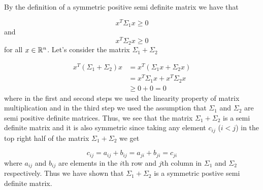 
By the definition of a symmetric positive semi definite matrix we have that 

\[
    x^{T} \Sigma_{1} x \geq 0
\] 
and 
\[
    x^{T}  \Sigma_{2} x \geq 0 
\] 
for all $ x \in \mathbb{R}^{n} $. Let's consider the matrix $ \Sigma_1 + \Sigma_2$

\begin{align*}
   x^{T} ( \Sigma_{1} + \Sigma_2) x &= x^{T} (\Sigma_1 x + \Sigma_2 x)\\
				    &= x^{T} \Sigma_{1} x + x^{T} \Sigma_2 x\\
				    &\geq 0 + 0 = 0
\end{align*}
where in the first and second steps we used the linearity property of matrix multiplication and in
the third step we used the assumption that $ \Sigma_1$ and $ \Sigma_2$ are semi positive definite
matrices. Thus, we see that the matrix $ \Sigma_1 + \Sigma_2$ is a semi definite matrix and it is
also symmetric since taking any element $ c_{ij} $ ($ i< j$) in the top right half of the matrix $
\Sigma_1 + \Sigma_2$ we get

\[
    c_{ij} = a_{ij} + b_{ij} = a_{ji} + b_{ji} = c_{ji}  
\] 
where $ a_{ij} $ and $ b_{ij} $ are elements in the $ i$th row and $ j$th column in $ \Sigma_1$ and
$ \Sigma_2$ respectively. Thus we have shown that $ \Sigma_1 + \Sigma_2$ is a symmetric postive semi
definite matrix.
